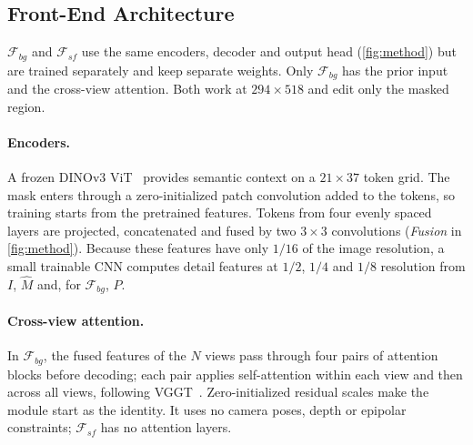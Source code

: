 \subsection{Front-End Architecture}
\label{sec:architecture}

$\mathcal{F}_{bg}$ and $\mathcal{F}_{sf}$ use the same encoders, decoder and output head (\cref{fig:method}) but are trained separately and keep separate weights.
Only $\mathcal{F}_{bg}$ has the prior input and the cross-view attention.
Both work at $294 \times 518$ and edit only the masked region.

\paragraph{Encoders.}
A frozen DINOv3 ViT~\cite{dinov3} provides semantic context on a $21 \times 37$ token grid.
The mask enters through a zero-initialized patch convolution added to the tokens, so training starts from the pretrained features.
Tokens from four evenly spaced layers are projected, concatenated and fused by two $3{\times}3$ convolutions (\emph{Fusion} in \cref{fig:method}).
Because these features have only $1/16$ of the image resolution, a small trainable CNN computes detail features at $1/2$, $1/4$ and $1/8$ resolution from $I$, $\hat M$ and, for $\mathcal{F}_{bg}$, $P$.

\paragraph{Cross-view attention.}
In $\mathcal{F}_{bg}$, the fused features of the $N$ views pass through four pairs of attention blocks before decoding; each pair applies self-attention within each view and then across all views, following VGGT~\cite{vggt}.
Zero-initialized residual scales make the module start as the identity.
It uses no camera poses, depth or epipolar constraints; $\mathcal{F}_{sf}$ has no attention layers.

